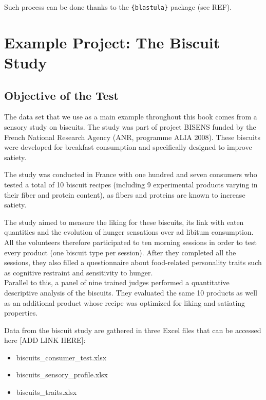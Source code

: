 \documentclass[
]{krantz}
\providecommand{\tightlist}{%
  \setlength{\itemsep}{0pt}\setlength{\parskip}{0pt}}
\begin{document}
Such process can be done thanks to the \texttt{\{blastula\}} package (see REF).

\hypertarget{example-projects}{%
\chapter{Example Project: The Biscuit Study}\label{example-projects}}

\hypertarget{objective-of-the-test}{%
\section{Objective of the Test}\label{objective-of-the-test}}

The data set that we use as a main example throughout this book comes from a sensory study on biscuits. The study was part of project BISENS funded by the French National Research Agency (ANR, programme ALIA 2008). These biscuits were developed for breakfast consumption and specifically designed to improve satiety.

The study was conducted in France with one hundred and seven consumers who tested a total of 10 biscuit recipes (including 9 experimental products varying in their fiber and protein content), as fibers and proteins are known to increase satiety.

The study aimed to measure the liking for these biscuits, its link with eaten quantities and the evolution of hunger sensations over ad libitum consumption. All the volunteers therefore participated to ten morning sessions in order to test every product (one biscuit type per session). After they completed all the sessions, they also filled a questionnaire about food-related personality traits such as cognitive restraint and sensitivity to hunger.\\
Parallel to this, a panel of nine trained judges performed a quantitative descriptive analysis of the biscuits. They evaluated the same 10 products as well as an additional product whose recipe was optimized for liking and satiating properties.

Data from the biscuit study are gathered in three Excel files that can be accessed here {[}ADD LINK HERE{]}:

\begin{itemize}
\tightlist
\item
  biscuits\_consumer\_test.xlsx\\
\item
  biscuits\_sensory\_profile.xlsx\\
\item
  biscuits\_traits.xlsx
\end{itemize}
\end{document}
